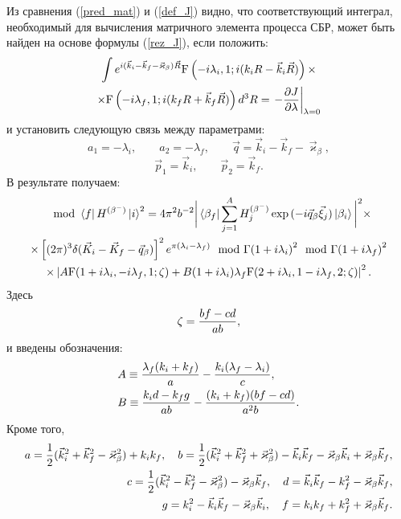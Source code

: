 \documentclass[14pt, a4paper]{article}
\numberwithin{figure}{section}
\numberwithin{equation}{section}
\begin{document}
Из сравнения (\ref{pred_mat}) и (\ref{def_J}) видно, что соответствующий интеграл,
необходимый для вычисления матричного  элемента процесса СБР, может
быть найден на основе формулы (\ref{rez_J}), если положить:
\begin{multline*}
\int e^{i(\vec k_i - \vec k_f -  \vec \varkappa_\beta)\vec R}
{\rm F} \left(-i \lambda_i,1;i(k_i R - \vec k_i \vec R)\right)\times\\
\times{\rm F} \left(-i \lambda_f,1;i(k_f R + \vec k_f \vec R)\right) d^3 R=
\left.-{{\partial J}\over{\partial \lambda}}\right|_{\lambda=0}
\end{multline*}
и установить следующую связь между параметрами:
$$
a_1=-\lambda_i, \qquad a_2=-\lambda_f, \qquad \vec q= \vec k_i - \vec k_f - \vec \varkappa_\beta,
$$
$$
\vec p_1 =\vec k_i,  \qquad \vec p_2 =\vec k_f.
$$
В результате получаем:
\begin{multline}\label{mat^2}
\mod{\bra{f} H^{(\beta^-)}\ket{i}}^2
=4\pi^2b^{-2}\bigg| \bra{\beta_f } \sum_{j=1}^A H^{(\beta^-)}_{j}\exp{(-i\vec q_\beta\vec\xi_{j})}
\ket{ \beta_i}\bigg|^2
\times\\
\times
\left[(2\pi)^3 \delta (\vec K_i - \vec K_f - \vec q_\beta)\right]^2
e^{{\pi} (\lambda_i - \lambda_f)}{{\mod{\Gamma{(1+i\lambda_i)}}^2
		\mod{\Gamma{(1+i\lambda_f)}}^2}} \\
\times \left| A
{\rm F} (1+i \lambda_i,-i \lambda_f,1;\zeta)
+B
(1+i \lambda_i)\lambda_f {\rm F} (2+i \lambda_i,1-i \lambda_f,2;\zeta)
\right|^2.
\end{multline}
Здесь
\begin{eqnarray}\label{zeta}
\zeta={{b f - c d}\over{ab}},
\end{eqnarray}
и введены обозначения:
\begin{equation}\label{AB}
\begin{split}
&A \equiv {{\lambda_f(k_i+k_f)}\over{a}}-{{k_i(\lambda_f-\lambda_i)}\over{c}},\\
&B \equiv {{k_i d-k_f g}\over{ab}}-{{(k_i+k_f)(b f-c d)}\over{a^2 b}}.
\end{split}
\end{equation}
Кроме того,
\begin{eqnarray}
a={1\over2}(\vec k_i^2+\vec k_f^2-\vec \varkappa_\beta^2)+k_i k_f,
\quad b={1\over2}(\vec k_i^2+\vec k_f^2+\vec \varkappa_\beta^2)-\vec k_i \vec k_f
-\vec \varkappa_\beta\vec k_i+\vec \varkappa_\beta\vec k_f,\nonumber\\
c={1\over2}(\vec k_i^2-\vec k_f^2-\vec \varkappa_\beta^2)- \vec \varkappa_\beta \vec k_f,
\quad d=\vec k_i \vec k_f-k_f^2-\vec \varkappa_\beta\vec k_f,\nonumber\\
g=k_i^2-\vec k_i \vec k_f-\vec \varkappa_\beta\vec k_i,
\quad f= k_i k_f+k_f^2+\vec \varkappa_\beta\vec k_f\nonumber.
\end{eqnarray}
\end{document}

